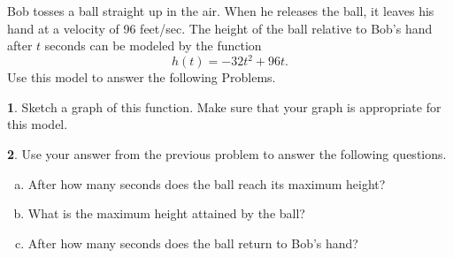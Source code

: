 \documentclass[12pt]{amsart}
\theoremstyle{definition}
\newtheorem{thm}{}
\begin{document}
\newpage
Bob tosses a ball straight up in the air.
When he releases the ball, it leaves his hand at a velocity of 96 feet/sec.
The height of the ball relative to Bob's hand after $t$ seconds can be modeled by the function
$$h(t) = -32t^2 + 96t.$$
Use this model to answer the following Problems.
\begin{thm}\label{problem: kinematics graph}
  Sketch a graph of this function.
  Make sure that your graph is appropriate for this model.
\end{thm}

\newpage

\begin{thm}\label{problem: maximum}
  Use your answer from the previous problem to answer the following questions.
  \begin{enumerate}[(a)]
  \item
    After how many seconds does the ball reach its maximum height?
    \vspace{2in}
  \item
    What is the maximum height attained by the ball?
    \vspace{2in}
  \item
    After how many seconds does the ball return to Bob's hand?
  \end{enumerate}
\end{thm}
\end{document}
